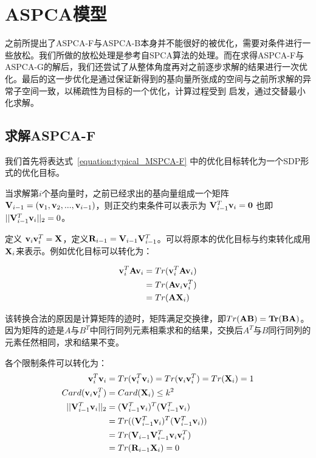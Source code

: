 \chapter{ASPCA模型}

之前所提出了ASPCA-F与ASPCA-B本身并不能很好的被优化，需要对条件进行一些放松。我们所做的放松处理是参考自SPCA算法的处理\cite{SPCA-SDP}。而在求得ASPCA-F与ASPCA-G的解后，我们还尝试了从整体角度再对之前逐步求解的结果进行一次优化。最后的这一步优化是通过保证新得到的基向量所张成的空间与之前所求解的异常子空间一致，以稀疏性为目标的一个优化，计算过程受到 \cite{SPCA-2006}启发，通过交替最小化求解。

\section{求解ASPCA-F}

我们首先将表达式~\ref{equation:typical_MSPCA-F} 中的优化目标转化为一个SDP形式的优化目标。

当求解第$i$个基向量时，之前已经求出的基向量组成一个矩阵 ${\bf V}_{i-1} = ({\bf v}_1, {\bf v}_2, ... ,{\bf v}_{i-1})$，则正交约束条件可以表示为 ${\bf V}_{i-1}^T{\bf v}_i={\bf 0}$ 也即 $||{\bf V}_{i-1}^T{\bf v}_i||_2=0$。

定义 ${\bf v}_i{\bf v}_i^T={\bf X}$，定义${\bf R}_{i-1} = {\bf V}_{i-1}{\bf V}_{i-1}^T$。可以将原本的优化目标与约束转化成用${\bf X}_i$来表示。例如优化目标可以转化为：

\begin{equation*}
\begin{split}
{\bf v}_i^T{\bf A}{\bf v}_i & = Tr({\bf v}_i^T{\bf A}{\bf v}_i)\\
& = Tr({\bf A}{\bf v}_i{\bf v}_i^T)\\
& =Tr({\bf A}{\bf X}_i)
\end{split}
\end{equation*}

该转换合法的原因是计算矩阵的迹时，矩阵满足交换律，即$Tr(\bf{AB})=Tr(\bf{BA})$。因为矩阵的迹是$A$与$B^T$中同行同列元素相乘求和的结果，交换后$A^T$与$B$同行同列的元素任然相同，求和结果不变。

各个限制条件可以转化为：
\begin{equation*}
	\begin{split}
		{\bf v}_i^T{\bf v}_i &=Tr({\bf v}_i^T{\bf v}_i)=Tr({\bf v}_i{\bf v}_i^T) = Tr({\bf X}_i)=1\\
		Card({\bf v}_i{\bf v}_i^T) &= Card({\bf X}_i) \leq k^2 \\
		||{\bf V}_{i-1}^T{\bf v}_i||_2 &=({\bf V}_{i-1}^T{\bf v}_i)^T({\bf V}_{i-1}^T{\bf v}_i) \\
		&=Tr(({\bf V}_{i-1}^T{\bf v}_i)^T({\bf V}_{i-1}^T{\bf v}_i))\\
		& =Tr({\bf V}_{i-1}{\bf V}_{i-1}^T{\bf v}_i{\bf v}_i^T)\\
		& =Tr({\bf R}_{i-1}{\bf X}_i)=0
	\end{split}
\end{equation*}

